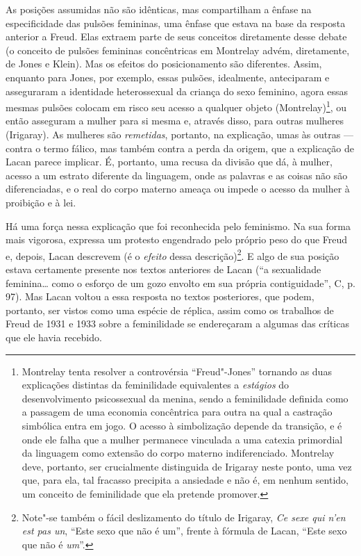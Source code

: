 As posições assumidas não são idênticas, mas compartilham a ênfase na
especificidade das pulsões femininas, uma ênfase que estava na base da
resposta anterior a Freud. Elas extraem parte de seus conceitos
diretamente desse debate (o conceito de pulsões femininas concêntricas
em Montrelay advém, diretamente, de Jones e Klein). Mas os efeitos do
posicionamento são diferentes. Assim, enquanto para Jones, por exemplo,
essas pulsões, idealmente, anteciparam e asseguraram a identidade
heterossexual da criança do sexo feminino, agora essas mesmas pulsões
colocam em risco seu acesso a qualquer objeto (Montrelay)\footnote{Montrelay
  tenta resolver a controvérsia ``Freud"-Jones'' tornando as duas
  explicações distintas da feminilidade equivalentes a \emph{estágios}
  do desenvolvimento psicossexual da menina, sendo a feminilidade
  definida como a passagem de uma economia concêntrica para outra na
  qual a castração simbólica entra em jogo. O acesso à simbolização
  depende da transição, e é onde ele falha que a mulher permanece
  vinculada a uma catexia primordial da linguagem como extensão do corpo
  materno indiferenciado. Montrelay deve, portanto, ser crucialmente
  distinguida de Irigaray neste ponto, uma vez que, para ela, tal
  fracasso precipita a ansiedade e não é, em nenhum sentido, um conceito
  de feminilidade que ela pretende promover.}, ou então asseguram a
mulher para si mesma e, através disso, para outras mulheres (Irigaray).
As mulheres são \emph{remetidas}, portanto, na explicação, umas às
outras --- contra o termo fálico, mas também contra a perda da origem,
que a explicação de Lacan parece implicar. É, portanto, uma recusa da
divisão que dá, à mulher, acesso a um estrato diferente da linguagem,
onde as palavras e as coisas não são diferenciadas, e o real do corpo
materno ameaça ou impede o acesso da mulher à proibição e à lei.

Há uma força nessa explicação que foi reconhecida pelo feminismo. Na sua
forma mais vigorosa, expressa um protesto engendrado pelo próprio peso
do que Freud e, depois, Lacan descrevem (é o \emph{efeito} dessa
descrição)\footnote{Note"-se também o fácil deslizamento do título de
  Irigaray, \emph{Ce sexe qui n'en est pas un}, ``Este sexo que não é
  um'', frente à fórmula de Lacan, ``Este sexo que não é \emph{um}''.}.
E algo de sua posição estava certamente presente nos textos anteriores
de Lacan (``a sexualidade feminina\ldots{} como o esforço de um gozo envolto
em sua própria contiguidade'', C, p. 97). Mas Lacan voltou a essa
resposta no textos posteriores, que podem, portanto, ser vistos como uma
espécie de réplica, assim como os trabalhos de Freud de 1931 e 1933
sobre a feminilidade se endereçaram a algumas das críticas que ele havia
recebido.

